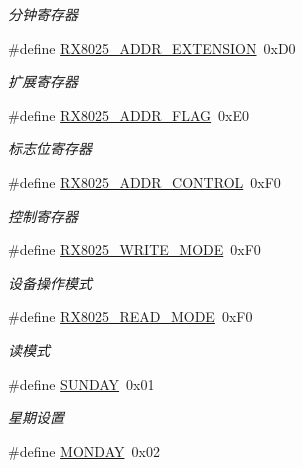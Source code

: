 \begin{DoxyCompactItemize}
\begin{DoxyCompactList}\small\item\em 分钟寄存器 \end{DoxyCompactList}\item 
\hypertarget{group___r_t_c_gaed871931d582bd8e566fe78ab63de303}{\#define \hyperlink{group___r_t_c_gaed871931d582bd8e566fe78ab63de303}{\-R\-X8025\-\_\-\-A\-D\-D\-R\-\_\-\-E\-X\-T\-E\-N\-S\-I\-O\-N}~0x\-D0}\label{group___r_t_c_gaed871931d582bd8e566fe78ab63de303}

\begin{DoxyCompactList}\small\item\em 扩展寄存器 \end{DoxyCompactList}\item 
\hypertarget{group___r_t_c_ga1aff3dd19320a3ba36ac48fe1af6eeb7}{\#define \hyperlink{group___r_t_c_ga1aff3dd19320a3ba36ac48fe1af6eeb7}{\-R\-X8025\-\_\-\-A\-D\-D\-R\-\_\-\-F\-L\-A\-G}~0x\-E0}\label{group___r_t_c_ga1aff3dd19320a3ba36ac48fe1af6eeb7}

\begin{DoxyCompactList}\small\item\em 标志位寄存器 \end{DoxyCompactList}\item 
\hypertarget{group___r_t_c_ga3462d91191aa01f9d3605bde19cc418d}{\#define \hyperlink{group___r_t_c_ga3462d91191aa01f9d3605bde19cc418d}{\-R\-X8025\-\_\-\-A\-D\-D\-R\-\_\-\-C\-O\-N\-T\-R\-O\-L}~0x\-F0}\label{group___r_t_c_ga3462d91191aa01f9d3605bde19cc418d}

\begin{DoxyCompactList}\small\item\em 控制寄存器 \end{DoxyCompactList}\item 
\#define \hyperlink{group___r_t_c_ga85b5a97fce88a05c8211049ab07be590}{\-R\-X8025\-\_\-\-W\-R\-I\-T\-E\-\_\-\-M\-O\-D\-E}~0x\-F0
\begin{DoxyCompactList}\small\item\em 设备操作模式 \end{DoxyCompactList}\item 
\hypertarget{group___r_t_c_ga783718aa6e959ed6f154c56060438164}{\#define \hyperlink{group___r_t_c_ga783718aa6e959ed6f154c56060438164}{\-R\-X8025\-\_\-\-R\-E\-A\-D\-\_\-\-M\-O\-D\-E}~0x\-F0}\label{group___r_t_c_ga783718aa6e959ed6f154c56060438164}

\begin{DoxyCompactList}\small\item\em 读模式 \end{DoxyCompactList}\item 
\#define \hyperlink{group___r_t_c_ga6764dc0bd7e59b4eca8d525f8136fd86}{\-S\-U\-N\-D\-A\-Y}~0x01
\begin{DoxyCompactList}\small\item\em 星期设置 \end{DoxyCompactList}\item 
\hypertarget{group___r_t_c_ga7170de6ea0ab27a44b607e025eeda10b}{\#define \hyperlink{group___r_t_c_ga7170de6ea0ab27a44b607e025eeda10b}{\-M\-O\-N\-D\-A\-Y}~0x02}\label{group___r_t_c_ga7170de6ea0ab27a44b607e025eeda10b}


\end{DoxyCompactItemize}
